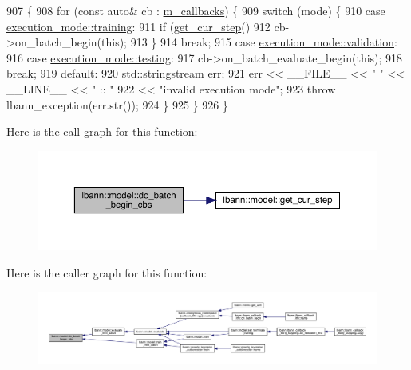 \begin{DoxyCode}
907                                                   \{
908   \textcolor{keywordflow}{for} (\textcolor{keyword}{const} \textcolor{keyword}{auto}& cb : \hyperlink{classlbann_1_1model_a07b511fef30368494c2ad80922ffd0eb}{m\_callbacks}) \{
909     \textcolor{keywordflow}{switch} (mode) \{
910     \textcolor{keywordflow}{case} \hyperlink{base_8hpp_a2781a159088df64ed7d47cc91c4dc0a8ac185ddac8b5a8f5aa23c5b80bc12d214}{execution\_mode::training}:
911       \textcolor{keywordflow}{if} (\hyperlink{classlbann_1_1model_ad0cdcba177434b52dc9c4a97be183a92}{get\_cur\_step}() %
912         cb->on\_batch\_begin(\textcolor{keyword}{this});
913       \}
914       \textcolor{keywordflow}{break};
915     \textcolor{keywordflow}{case} \hyperlink{base_8hpp_a2781a159088df64ed7d47cc91c4dc0a8aa617908b172c473cb8e8cda059e55bf0}{execution\_mode::validation}:
916     \textcolor{keywordflow}{case} \hyperlink{base_8hpp_a2781a159088df64ed7d47cc91c4dc0a8aae2b1fca515949e5d54fb22b8ed95575}{execution\_mode::testing}:
917       cb->on\_batch\_evaluate\_begin(\textcolor{keyword}{this});
918       \textcolor{keywordflow}{break};
919     \textcolor{keywordflow}{default}:
920       std::stringstream err;
921       err << \_\_FILE\_\_ << \textcolor{stringliteral}{" "} << \_\_LINE\_\_ << \textcolor{stringliteral}{" :: "}
922           << \textcolor{stringliteral}{"invalid execution mode"};
923       \textcolor{keywordflow}{throw} lbann\_exception(err.str());
924     \}
925   \}
926 \}
\end{DoxyCode}
Here is the call graph for this function\+:\nopagebreak
\begin{figure}[H]
\begin{center}
\leavevmode
\includegraphics[width=350pt]{classlbann_1_1model_a156acfa740b92322d44b6c477636eb26_cgraph}
\end{center}
\end{figure}
Here is the caller graph for this function\+:\nopagebreak
\begin{figure}[H]
\begin{center}
\leavevmode
\includegraphics[width=350pt]{classlbann_1_1model_a156acfa740b92322d44b6c477636eb26_icgraph}
\end{center}
\end{figure}
